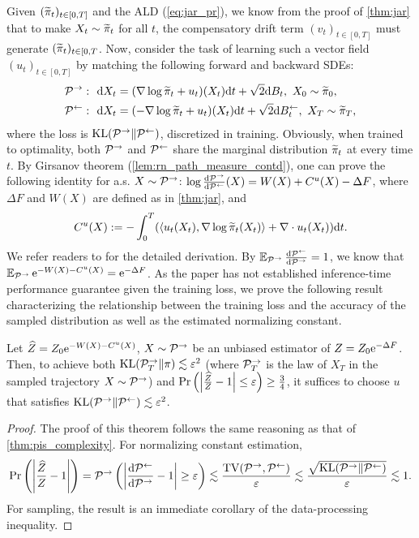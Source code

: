 Given $(\widetilde{\pi}_t)_{t\in[0,T]}$ and the ALD (\cref{eq:jar_pr}), we know from the proof of \cref{thm:jar} that to make $X_t\sim\widetilde{\pi}_t$ for all $t$, the compensatory drift term $(v_t)_{t\in[0,T]}$ must generate $(\widetilde{\pi}_t)_{t\in[0,T}$. 
Now, consider the task of learning such a vector field $(u_t)_{t\in[0,T]}$ by matching the following forward and backward SDEs:
\begin{align*}
    \mathcal{P}^\to:~~&\mathrm{d} X_t=(\nabla\log\widetilde{\pi}_t+u_t)(X_t)\mathrm{d} t+\sqrt{2}\mathrm{d} B_t,~X_0\sim\widetilde{\pi}_0,\\
    \mathcal{P}^\gets:~~&\mathrm{d} X_t=(-\nabla\log\widetilde{\pi}_t+u_t)(X_t)\mathrm{d} t+\sqrt{2}\mathrm{d}B^\gets_t,~X_T\sim\widetilde{\pi}_T,
\end{align*}
where the loss is $\operatorname{KL}(\mathcal{P}^\to\|\mathcal{P}^\gets)$, discretized in training. Obviously, when trained to optimality, both $\mathcal{P}^\to$ and $\mathcal{P}^\gets$ share the marginal distribution $\widetilde{\pi}_t$ at every time $t$. By Girsanov theorem (\cref{lem:rn_path_measure_contd}), one can prove the following identity for a.s. $X\sim\mathcal{P}^\to$: $\log\frac{\mathrm{d}\mathcal{P}^\to}{\mathrm{d}\mathcal{P}^\gets}(X)=W(X)+C^u(X)-\Delta F$, where $\Delta F$ and $W(X)$ are defined as in \cref{thm:jar}, and
$$C^u(X):=-\int_0^T(\left\langle u_t(X_t),\nabla\log\widetilde{\pi}_t(X_t)\right\rangle+\nabla\cdot u_t(X_t))\mathrm{d} t.$$
We refer readers to \citet[Prop. 3.3]{vargas2024transport} for the detailed derivation. By $\operatorname{\mathbb{E}}_{\mathcal{P}^\to}\frac{\mathrm{d}\mathcal{P}^\gets}{\mathrm{d}\mathcal{P}^\to}=1$, we know that $\operatorname{\mathbb{E}}_{\mathcal{P}^\to}\mathrm{e}^{-W(X)-C^u(X)}=\mathrm{e}^{-\Delta F}$. 
As the paper has not established inference-time performance guarantee given the training loss, we prove the following result characterizing the relationship between the training loss and the accuracy of the sampled distribution as well as the estimated normalizing constant.

\begin{proposition}
    Let $\widehat{Z}=Z_0\mathrm{e}^{-W(X)-C^u(X)}$, $X\sim\mathcal{P}^\to$ be an unbiased estimator of $Z=Z_0\mathrm{e}^{-\Delta F}$. Then, to achieve both $\operatorname{KL}(\mathcal{P}^\to_T\|\pi)\lesssim\varepsilon^2$ (where $\mathcal{P}^\to_T$ is the law of $X_T$ in the sampled trajectory $X\sim\mathcal{P}^\to$) and $\operatorname{Pr}\left(\left|\frac{\widehat{Z}}{Z}-1\right|\le\varepsilon\right)\ge\frac{3}{4}$, it suffices to choose $u$ that satisfies $\operatorname{KL}(\mathcal{P}^\to\|\mathcal{P}^\gets)\lesssim\varepsilon^2$.
\end{proposition}

\begin{proof}
    The proof of this theorem follows the same reasoning as that of \cref{thm:pis_complexity}. For normalizing constant estimation,
    $$\operatorname{Pr}\left(\left|\frac{\widehat{Z}}{Z}-1\right|\right)=\mathcal{P}^\to\left(\left|\frac{\mathrm{d}\mathcal{P}^\gets}{\mathrm{d}\mathcal{P}^\to}-1\right|\ge\varepsilon\right)\lesssim\frac{\operatorname{TV}(\mathcal{P}^\to,\mathcal{P}^\gets)}{\varepsilon}\lesssim\frac{\sqrt{\operatorname{KL}(\mathcal{P}^\to\|\mathcal{P}^\gets)}}{\varepsilon}\lesssim1.$$
    For sampling, the result is an immediate corollary of the data-processing inequality.
\end{proof}